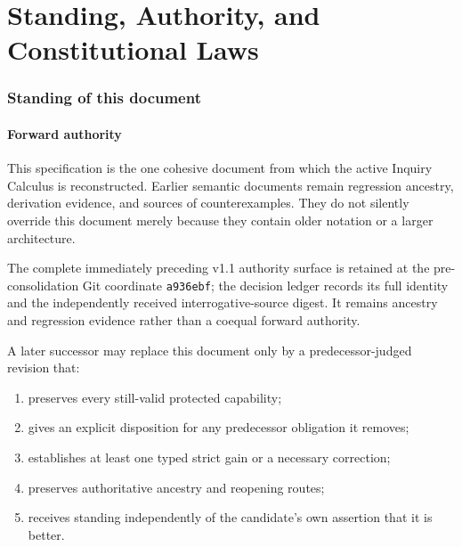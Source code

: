 \documentclass[11pt,oneside]{article}
\begin{document}
\begin{abstract}
The result is a recursively closed, well-typed calculus for forming distinctions, positively determining typed exteriority, returning through use-specific fibers, opening holes, generating and executing questions, inventing representations and probes, traversing reciprocal boundaries, preserving actuality, learning regenerative forms and operator paths, folding and reopening structure, and applying the same operations to its own presentation without self-warrant.
\end{abstract}

\tableofcontents
\newpage

\part{Standing, Authority, and Constitutional Laws}

\section{Standing of this document}

\subsection{Forward authority}

This specification is the one cohesive document from which the active Inquiry Calculus is
reconstructed.  Earlier semantic documents remain regression ancestry, derivation evidence, and
sources of counterexamples.  They do not silently override this document merely because they
contain older notation or a larger architecture.

The complete immediately preceding v1.1 authority surface is retained at the pre-consolidation Git
coordinate \texttt{a936ebf}; the decision ledger records its full identity and the independently
received interrogative-source digest.  It remains ancestry and regression evidence rather than a
coequal forward authority.

A later successor may replace this document only by a predecessor-judged revision that:
\begin{enumerate}
\item preserves every still-valid protected capability;
\item gives an explicit disposition for any predecessor obligation it removes;
\item establishes at least one typed strict gain or a necessary correction;
\item preserves authoritative ancestry and reopening routes;
\item receives standing independently of the candidate's own assertion that it is better.
\end{enumerate}
\end{document}
